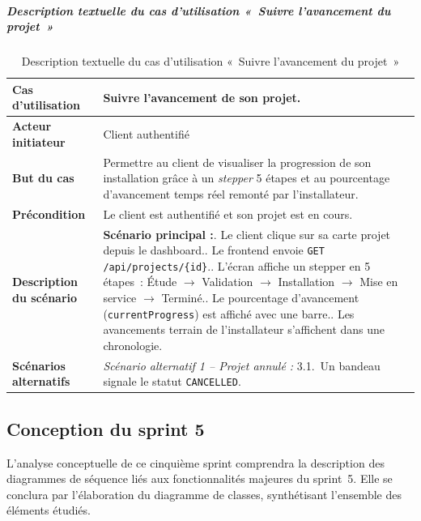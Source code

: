 \subparagraph{Description textuelle du cas d'utilisation «~Suivre l'avancement du projet~»}

\begin{table}[H]
  \caption{Description textuelle du cas d'utilisation «~Suivre l'avancement du projet~»}
  \label{tab:cu-suivre-projet}
  \centering
  \begin{tabularx}{\textwidth}{|L{3.8cm}|X|}
    \hline
    \textbf{Cas d'utilisation} & Suivre l'avancement de son projet. \\
    \hline
    \textbf{Acteur initiateur} & Client authentifié \\
    \hline
    \textbf{But du cas} & Permettre au client de visualiser la progression de son installation grâce à un \textit{stepper} 5 étapes et au pourcentage d'avancement temps réel remonté par l'installateur. \\
    \hline
    \textbf{Précondition} & Le client est authentifié et son projet est en cours. \\
    \hline
    \textbf{Description du scénario} &
    \textbf{Scénario principal :}. Le client clique sur sa carte projet depuis le dashboard.. Le frontend envoie \texttt{GET /api/projects/\{id\}}.. L'écran affiche un stepper en 5 étapes~: Étude $\rightarrow$ Validation $\rightarrow$ Installation $\rightarrow$ Mise en service $\rightarrow$ Terminé.. Le pourcentage d'avancement (\texttt{currentProgress}) est affiché avec une barre.. Les avancements terrain de l'installateur s'affichent dans une chronologie.\\
    \hline
    \textbf{Scénarios alternatifs} &
    \textit{Scénario alternatif 1 -- Projet annulé :}\newline
    \hspace*{6pt}3.1.~Un bandeau signale le statut \texttt{CANCELLED}.\\
    \hline
  \end{tabularx}
\end{table}

\subsection{Conception du sprint 5}

L'analyse conceptuelle de ce cinquième sprint comprendra la description des
diagrammes de séquence liés aux fonctionnalités majeures du sprint~5. Elle
se conclura par l'élaboration du diagramme de classes, synthétisant
l'ensemble des éléments étudiés.

